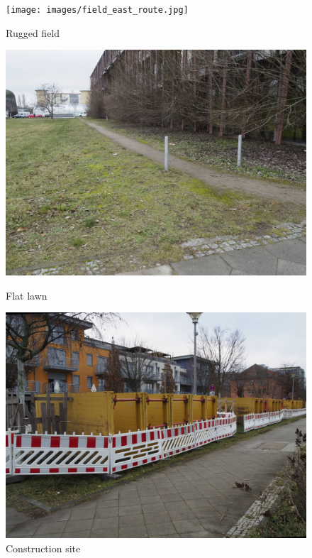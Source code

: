 \begin{figure}[!htb]
    \centering
    \begin{minipage}{.3333\textwidth}
        \centering
        \texttt{[image: images/field\_east\_route.jpg]}
        \caption{Rugged field}
        \label{fig:field_east}
    \end{minipage}%
    \begin{minipage}{.3333\textwidth}
        \centering
        \includegraphics[width=.9\linewidth]{images/field_south_route.jpg}
        \caption{Flat lawn}
        \label{fig:field_south}
    \end{minipage}%
    \begin{minipage}{.3333\textwidth}
        \centering
        \includegraphics[width=.9\linewidth]{images/construction_site.jpg}
        \caption{Construction site}
        \label{fig:construction_site}
    \end{minipage}
\end{figure}

